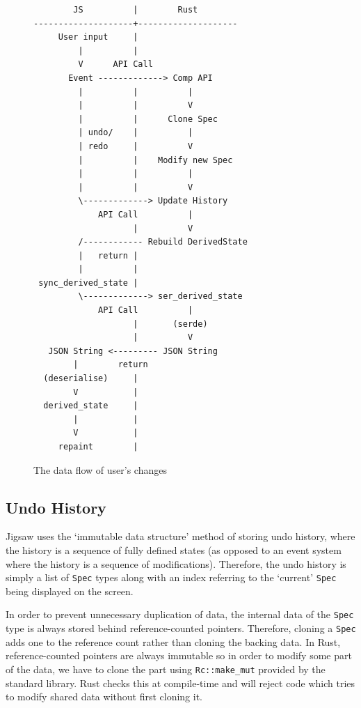 \documentclass[12pt]{article}
\begin{document}
\begin{figure}
    \centering
    \begin{BVerbatim}
        JS          |        Rust
--------------------+--------------------
     User input     |
         |          |
         V      API Call
       Event -------------> Comp API
         |          |          |
         |          |          V
         |          |      Clone Spec
         | undo/    |          |
         | redo     |          V
         |          |    Modify new Spec
         |          |          |
         |          |          V
         \-------------> Update History
             API Call          |
                    |          V
         /------------ Rebuild DerivedState
         |   return |
         |          |
 sync_derived_state |
         \-------------> ser_derived_state
             API Call          |
                    |       (serde)
                    |          V
   JSON String <--------- JSON String
        |        return
  (deserialise)     |
        V           |
  derived_state     |
        |           |
        V           |
     repaint        |
    \end{BVerbatim}
    \caption{The data flow of user's changes}\label{fig:app-data-flow}
\end{figure}

\subsection{Undo History}

Jigsaw uses the `immutable data structure' method of storing undo history, where the history is a
sequence of fully defined states (as opposed to an event system where the history is a sequence of
modifications).  Therefore, the undo history is simply a list of \verb|Spec| types along with an
index referring to the `current' \verb|Spec| being displayed on the screen.

In order to prevent unnecessary duplication of data, the internal data of the \verb|Spec| type is
always stored behind reference-counted pointers.  Therefore, cloning a \verb|Spec| adds one to the
reference count rather than cloning the backing data.  In Rust, reference-counted pointers are
always immutable so in order to modify some part of the data, we have to clone the part using
\verb|Rc::make_mut| provided by the standard library.  Rust checks this at compile-time and will
reject code which tries to modify shared data without first cloning it.
\end{document}
